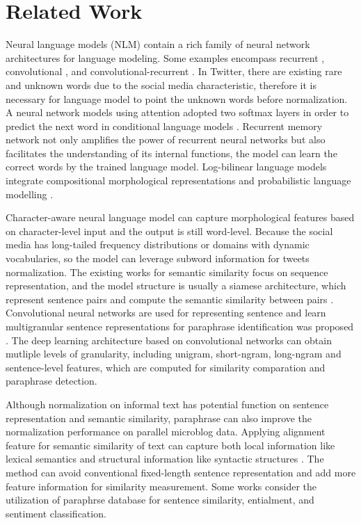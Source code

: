 \documentclass[letterpaper]{article}
\begin{document}
\section{Related Work}
Neural language models (NLM) contain a rich family of neural network architectures for language modeling. Some examples encompass recurrent \cite{mikolov2010recurrent}, convolutional \cite{wang-EtAl:2015:ACL-IJCNLP3}, and convolutional-recurrent \cite{Kim-AAAI1612489}. In Twitter, there are existing rare and unknown words due to the social media characteristic,  therefore it is necessary for language model to point the unknown words before normalization. A neural network models using attention adopted two softmax layers in order to predict the next word in conditional language models \cite{gulcehre-EtAl:2016:P16-1}. Recurrent memory network \cite{tran-bisazza-monz:2016:N16-1} not only amplifies the power of recurrent neural networks but also facilitates the understanding of its internal functions, the model can learn the correct words by the trained language model. Log-bilinear language models integrate compositional morphological representations and probabilistic language modelling \cite{jan-phil:2014:icml}.

Character-aware neural language model \cite{Kim-AAAI1612489} can capture morphological features based on character-level input and the output is still word-level. Because the social media has long-tailed frequency distributions or domains with dynamic vocabularies, so the model can leverage subword information for tweets normalization. The existing works for semantic similarity focus on sequence representation, and the model structure is usually a siamese architecture, which represent sentence pairs and compute the semantic similarity between pairs \cite{jonas-aditya:2016:AAAI}. Convolutional neural networks are used for representing sentence and learn multigranular sentence representations for paraphrase identification was proposed \cite{yin-schutze:2015:NAACL}. The deep learning architecture based on convolutional networks can obtain mutliple levels of granularity, including unigram, short-ngram, long-ngram and sentence-level features, which are computed for similarity comparation and paraphrase detection.

Although normalization on informal text has potential function on sentence representation and semantic similarity, paraphrase can also improve the normalization performance \cite{ling-EtAl:2013:EMNLP} on parallel microblog data. Applying alignment feature for semantic similarity of text can capture both local information like lexical semantics and structural information like syntactic structures \cite{chen-praveen:2016:ijcai}. The method can avoid conventional fixed-length sentence representation and add more feature information for similarity measurement. Some works \cite{DBLP:journals/corr/WietingBGL15a,pavlick-EtAl:2015:ACL-IJCNLP} consider the utilization of paraphrse database \cite{ganitkevitch-vandurme-callisonburch:2013:NAACL-HLT,pavlick-EtAl:2015:ACL-IJCNLP3} for sentence similarity, entialment, and sentiment classification.
\end{document}
